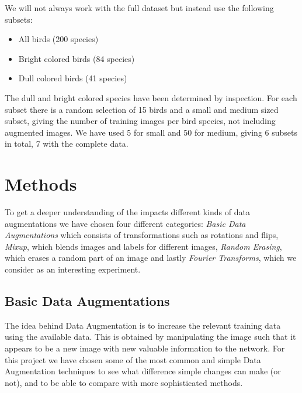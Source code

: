 \documentclass{article}
\begin{document}
We will not always work with the full dataset but instead use the following subsets:

\begin{itemize}
	\item All birds (200 species)
	\item Bright colored birds (84 species)
	\item Dull colored birds (41 species)
\end{itemize}

The dull and bright colored species have been determined by inspection. For each subset there is a random selection of 15 birds and a small and medium sized subset, giving the number of training images per bird species, not including augmented images. We have used 5 for small and 50 for medium, giving 6 subsets in total, 7 with the complete data.


\section{Methods}




To get a deeper understanding of the impacts different kinds of data augmentations 
we have chosen four different categories: \textit{Basic Data Augmentations} which consists of transformations such as rotations and flips, 
 \textit{Mixup}, which blends images and labels for different images, \textit{Random Erasing}, which erases a random part of an image and lastly 
\textit{Fourier Transforms}, which we consider as an interesting experiment.

\subsection{Basic Data Augmentations}
The idea behind Data Augmentation is to increase the relevant training data using the available data. This is obtained by manipulating the image such that it appears to be a new image with new valuable information to the network. For this project we have chosen some of the most common and simple Data Augmentation techniques to see what difference simple changes can make (or not), and to be able to compare with more sophisticated methods. 
\end{document}
